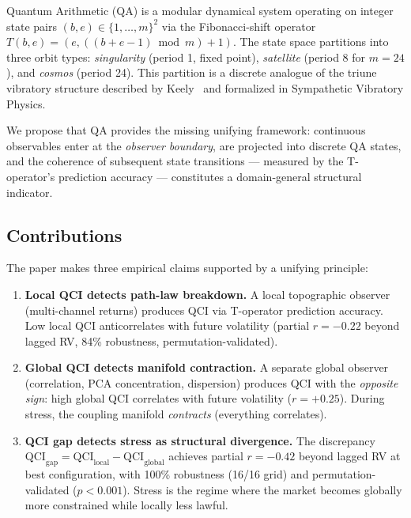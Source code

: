\documentclass[11pt,a4paper]{article}
\begin{document}
Quantum Arithmetic (QA) is a modular dynamical system operating on integer
state pairs $(b,e) \in \{1,\ldots,m\}^2$ via the Fibonacci-shift operator
$T(b,e) = (e, ((b+e-1) \bmod m) + 1)$. The state space partitions into
three orbit types: \emph{singularity} (period 1, fixed point),
\emph{satellite} (period 8 for $m=24$), and \emph{cosmos} (period 24).
This partition is a discrete analogue of the triune vibratory structure
described by Keely~\cite{keely} and formalized in Sympathetic Vibratory Physics.

We propose that QA provides the missing unifying framework: continuous
observables enter at the \emph{observer boundary}, are projected into discrete
QA states, and the coherence of subsequent state transitions --- measured by
the T-operator's prediction accuracy --- constitutes a domain-general
structural indicator.

\subsection{Contributions}

The paper makes three empirical claims supported by a unifying principle:

\begin{enumerate}
  \item[\textbf{A.}] \textbf{Local QCI detects path-law breakdown.}
    A local topographic observer (multi-channel returns) produces QCI via
    T-operator prediction accuracy. Low local QCI anticorrelates with future
    volatility (partial $r = -0.22$ beyond lagged RV, 84\% robustness,
    permutation-validated).
  \item[\textbf{B.}] \textbf{Global QCI detects manifold contraction.}
    A separate global observer (correlation, PCA concentration, dispersion)
    produces QCI with the \emph{opposite sign}: high global QCI correlates
    with future volatility ($r = +0.25$). During stress, the coupling
    manifold \emph{contracts} (everything correlates).
  \item[\textbf{C.}] \textbf{QCI gap detects stress as structural divergence.}
    The discrepancy $\text{QCI}_{\text{gap}} = \text{QCI}_{\text{local}} -
    \text{QCI}_{\text{global}}$ achieves partial $r = -0.42$ beyond lagged RV
    at best configuration, with 100\% robustness (16/16 grid) and
    permutation-validated ($p < 0.001$). Stress is the regime where the
    market becomes globally more constrained while locally less lawful.
\end{enumerate}
\end{document}
